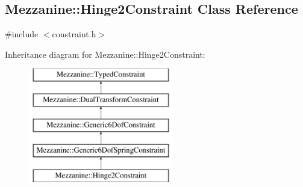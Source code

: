 \hypertarget{classMezzanine_1_1Hinge2Constraint}{
\subsection{Mezzanine::Hinge2Constraint Class Reference}
\label{classMezzanine_1_1Hinge2Constraint}
}


{\ttfamily \#include $<$constraint.h$>$}

Inheritance diagram for Mezzanine::Hinge2Constraint:\begin{figure}[H]
\begin{center}
\leavevmode
\includegraphics[height=5.000000cm]{classMezzanine_1_1Hinge2Constraint}
\end{center}
\end{figure}
